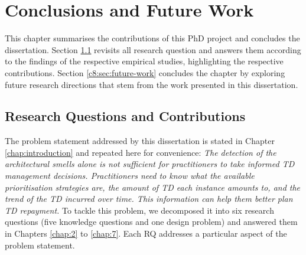 \setlength{\headheight}{1.2cm}
\renewcommand{\publ}{\flushleft\footnotesize{}}

\chapter{Conclusions and Future Work}\label{chap:8}
This chapter summarises the contributions of this PhD project and concludes the dissertation.
Section \ref{c8:sec:rq-contributions} revisits all research question and answers them according to the findings of the respective empirical studies, highlighting the respective contributions.
Section \ref{c8:sec:future-work} concludes the chapter by exploring future research directions that stem from the work presented in this dissertation.

\section{Research Questions and Contributions}\label{c8:sec:rq-contributions}
The problem statement addressed by this dissertation is stated in Chapter \ref{chap:introduction} and repeated here for convenience: \textit{The detection of the architectural smells alone is not sufficient for practitioners to take informed TD management decisions. Practitioners need to know what the available prioritisation strategies are, the amount of TD each instance amounts to, and the trend of the TD incurred over time. This information can help them better plan TD repayment.}
To tackle this problem, we decomposed it into six research questions (five knowledge questions and one design problem) and answered them in Chapters \ref{chap:2} to \ref{chap:7}.
Each RQ addresses a particular aspect of the problem statement.

